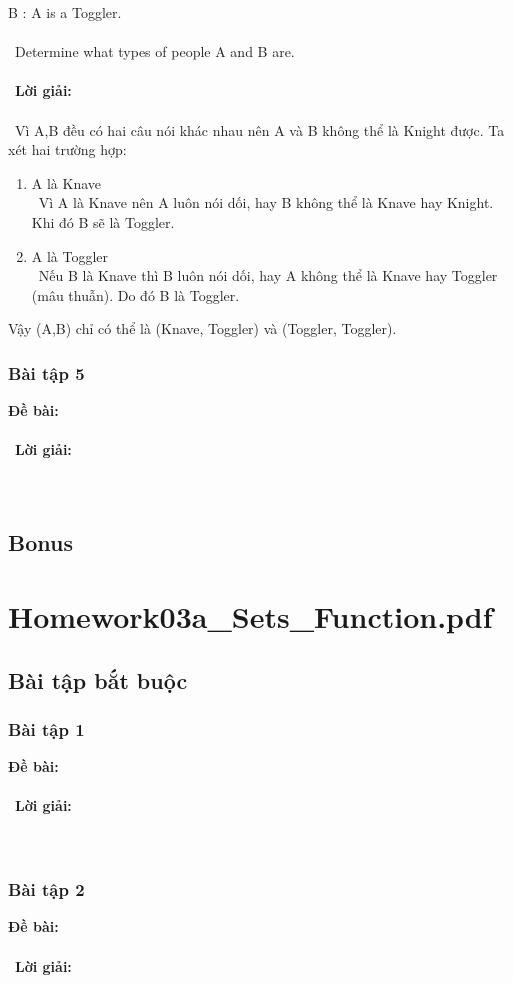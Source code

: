\documentclass[a4paper]{article}
\begin{document}
B : A is a Toggler.\\\ \\\
Determine what types of people A and B are. \\\ \\\
\textbf{Lời giải:} \\\ \\\
Vì A,B đều có hai câu nói khác nhau nên A và B không thể là Knight được. Ta xét hai trường hợp: 
\begin{enumerate}
\item A là Knave \\\
Vì A là Knave nên A luôn nói dối, hay B không thể là Knave hay Knight. Khi đó B sẽ là Toggler.
\item A là Toggler \\\
Nếu B là Knave thì B luôn nói dối, hay A không thể là Knave hay Toggler (mâu thuẫn). Do đó B là Toggler.
\end{enumerate}
Vậy (A,B) chỉ có thể là (Knave, Toggler) và (Toggler, Toggler).

\clearpage
\subsubsection{Bài tập 5}
\textbf{Đề bài:} 
\\\ \\\
\textbf{Lời giải:} \\\ \\\
\clearpage
\subsection{Bonus}
\clearpage

\section{Homework03a\_Sets\_Function.pdf}
\subsection{Bài tập bắt buộc}
\subsubsection{Bài tập 1}
\textbf{Đề bài:} 
\\\ \\\
\textbf{Lời giải:} \\\ \\\
\clearpage
\subsubsection{Bài tập 2}
\textbf{Đề bài:} 
\\\ \\\
\textbf{Lời giải:} \\\ \\\
\clearpage
\end{document}
